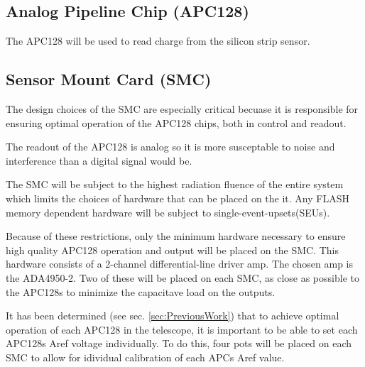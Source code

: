 \documentclass{article}
\begin{document}
\subsection{Analog Pipeline Chip (APC128)}
The APC128 will be used to read charge from the silicon strip sensor. 

\subsection{Sensor Mount Card (SMC)}
\label{HardProp:SMC}

The design choices of the SMC are especially critical becuase it is responsible for ensuring optimal operation of the APC128 chips, both in control and readout. 

The readout of the APC128 is analog so it is more susceptable to noise and interference than a digital signal would be. 

The SMC will be subject to the highest radiation fluence of the entire system which limits the choices of hardware that can be placed on the it. Any FLASH memory dependent hardware will be subject to single-event-upsets(SEUs). 

Because of these restrictions, only the minimum hardware necessary to ensure high quality APC128 operation and output will be placed on the SMC. This hardware consists of a 2-channel differential-line driver amp. The chosen amp is the ADA4950-2. Two of these will be placed on each SMC, as close as possible to the APC128s to minimize the capacitave load on the outputs.

It has been determined (see sec. \ref{sec:PreviousWork}) that to achieve optimal operation of each APC128 in the telescope, it is important to be able to set each APC128s Aref voltage individually. To do this, four pots will be placed on each SMC to allow for idividual calibration of each APCs Aref value.
\end{document}
